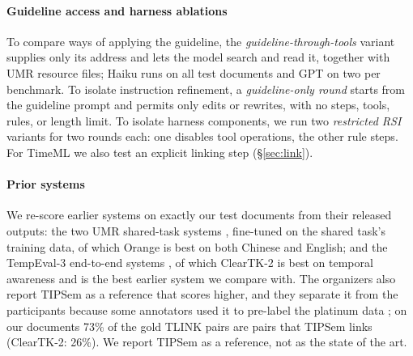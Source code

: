 \paragraph{Guideline access and harness ablations}
To compare ways of applying the guideline, the \emph{guideline-through-tools} variant supplies only its address and lets the model search and read it, together with UMR resource files; Haiku runs on all test documents and GPT on two per benchmark. To isolate instruction refinement, a \emph{guideline-only round} starts from the guideline prompt and permits only edits or rewrites, with no steps, tools, rules, or length limit. To isolate harness components, we run two \emph{restricted RSI} variants for two rounds each: one disables tool operations, the other rule steps. For TimeML we also test an explicit linking step (\S\ref{sec:link}).

\paragraph{Prior systems}
We re-score earlier systems on exactly our test documents from their released outputs: the two UMR shared-task systems \citep{heinecke2026orange,devergnette2026sema}, fine-tuned on the shared task's training data, of which Orange is best on both Chinese and English; and the TempEval-3 end-to-end systems \citep{uzzaman2013semeval}, of which ClearTK-2 \citep{bethard2013cleartk} is best on temporal awareness and is the best earlier system we compare with. The organizers also report TIPSem \citep{llorens2010tipsem} as a reference that scores higher, and they separate it from the participants because some annotators used it to pre-label the platinum data \citep[\S2.2, \S5]{uzzaman2013semeval}; on our documents 73\% of the gold TLINK pairs are pairs that TIPSem links (ClearTK-2: 26\%). We report TIPSem as a reference, not as the state of the art.
